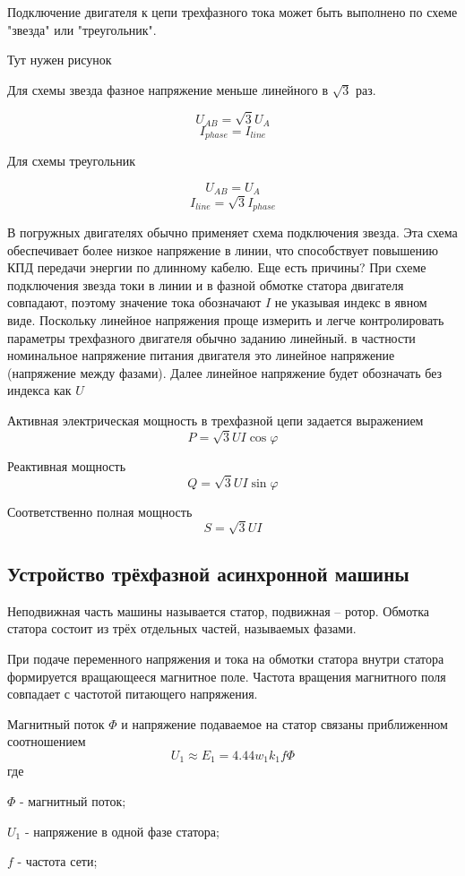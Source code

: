 \documentclass[]{scrreprt}
\begin{document}
Подключение двигателя к цепи трехфазного тока может быть выполнено по схеме "звезда" или "треугольник".

Тут нужен рисунок  

Для схемы звезда фазное напряжение меньше линейного в $\sqrt{3}$ раз.

$$ U_{AB} = \sqrt{3} U_{A} $$
$$ I_{phase} = I_{line} $$

Для схемы треугольник 

$$ U_{AB} =  U_{A} $$
$$ I_{line} =\sqrt{3} I_{phase} $$


В погружных двигателях обычно применяет схема подключения звезда. Эта схема обеспечивает более низкое напряжение в линии, что способствует повышению КПД передачи энергии по длинному кабелю. Еще есть причины?
При схеме подключения звезда токи в линии и в фазной обмотке статора двигателя совпадают, поэтому значение тока обозначают $I$ не указывая индекс в явном виде. Поскольку линейное напряжения проще измерить и легче контролировать параметры трехфазного двигателя обычно заданию линейный. в частности номинальное напряжение питания двигателя это линейное напряжение (напряжение между фазами). Далее линейное напряжение будет обозначать без индекса как $U$

Активная электрическая мощность в трехфазной цепи задается выражением 
$$ P= \sqrt{3}U I \cos \varphi$$

Реактивная мощность 
$$ Q= \sqrt{3}U I \sin \varphi$$

Соответственно полная мощность 
$$ S= \sqrt{3}U I $$

\subsection{ Устройство трёхфазной асинхронной машины}
Неподвижная часть машины называется статор, подвижная – ротор. Обмотка статора состоит из трёх отдельных частей, называемых фазами.

При подаче переменного напряжения и тока на обмотки статора внутри статора формируется вращающееся магнитное поле. Частота вращения магнитного поля совпадает с частотой питающего напряжения. 

Магнитный поток $\Phi $ и напряжение подаваемое на статор связаны приближенном соотношением 
$$ U_1 \approx E_1 = 4.44 w_1 k_1 f \Phi $$
где 

 $\Phi$ -  магнитный поток;
 
 $U_1$ -	напряжение в одной фазе статора;
 
 $f$   - частота сети;
 
\end{document}

